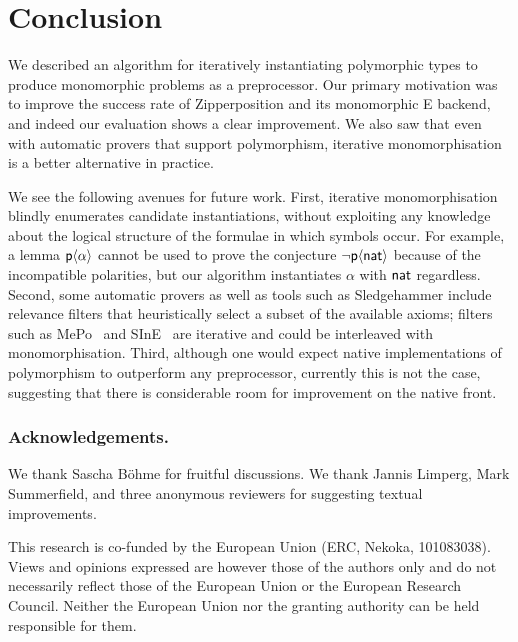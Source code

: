 \documentclass[runningheads]{llncs}
\begin{document}
\section{Conclusion}
\label{sec:conclusion}

We described an algorithm for iteratively instantiating polymorphic types to
produce monomorphic problems as a preprocessor. Our primary motivation was to
improve the success rate of Zipperposition and its monomorphic E backend, and
indeed our evaluation shows a clear improvement. We also saw that even with
automatic provers that support polymorphism, iterative monomorphisation is a
better alternative in practice.

We see the following avenues for future work. First, iterative monomorphisation
blindly enumerates candidate instantiations, without exploiting any knowledge
about the logical structure of the formulae in which symbols occur. For
example, a lemma $\textsf{p}\langle\alpha\rangle$ cannot be used to prove the
conjecture $\lnot \textsf{p}\langle\textsf{nat}\rangle$ because of the incompatible
polarities, but our algorithm instantiates $\alpha$ with $\textsf{nat}$ regardless.
Second, some automatic provers as well as tools such as Sledgehammer include
relevance filters that heuristically select a subset of the available axioms;
filters such as MePo~\cite{meng-paulson-2009} and SInE~\cite{hoder-voronkov-2011} are iterative and could be interleaved with
monomorphisation. Third, although one would expect native implementations of
polymorphism to outperform any preprocessor, currently this is not the case, suggesting that there is considerable room for improvement on the native front.

\begin{credits}
   \subsubsection{Acknowledgements.}

   We thank Sascha Böhme for fruitful discussions.
   We thank Jannis Limperg, Mark Summerfield, and three anonymous reviewers for suggesting textual improvements.

   This research is co-funded by the European Union (ERC, Nekoka, 101083038). Views and opinions expressed are however those of the authors only and do not necessarily reflect those of the European Union or the European Research Council. Neither the European Union nor the granting authority can be held responsible for them.
\end{credits}
\end{document}
